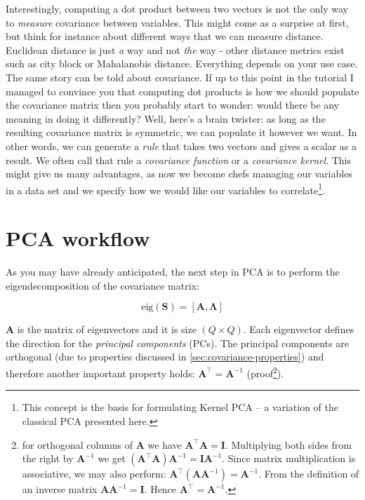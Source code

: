 \documentclass[10pt,twocolumn]{article}
\begin{document}
Interestingly, computing a dot product between two vectors is not the only way to \textit{measure} covariance between variables. This might come as a surprise at first, but think for instance about different ways that we can measure distance. Euclidean distance is just \textit{a} way and not \textit{the} way - other distance metrics exist such as city block or Mahalanobis distance. Everything depends on your use case. The same story can be told about covariance. If up to this point in the tutorial I managed to convince you that computing dot products is how we should populate the covariance matrix then you probably start to wonder: would there be any meaning in doing it differently? Well, here's a brain twister: as long as the resulting covariance matrix is symmetric, we can populate it however we want. In other words, we can generate a \textit{rule} that takes two vectors and gives a scalar as a result. We often call that rule a \textit{covariance function} or a \textit{covariance kernel}. This might give us many advantages, as now we become chefs managing our variables in a data set and we specify how we would like our variables to correlate\footnote{This concept is the basis for formulating Kernel PCA -- a variation of the classical PCA presented here.}.


\section{PCA workflow}

As you may have already anticipated, the next step in PCA is to perform the eigendecomposition of the covariance matrix:

\begin{equation} \label{eq:eig-dec}
\text{eig}(\mathbf{S}) = [\mathbf{A}, \mathbf{\Lambda}]
\end{equation}

$\mathbf{A}$ is the matrix of eigenvectors and it is size $(Q \times Q)$. Each eigenvector defines the direction for the \textit{principal components} (PCs). The principal components are orthogonal (due to properties discussed in \ref{sec:covariance-properties}) and therefore another important property holds: $\mathbf{A}^{\top} = \mathbf{A}^{-1}$ (proof\footnote{for orthogonal columns of $\mathbf{A}$ we have $\mathbf{A}^{\top} \mathbf{A} = \mathbf{I}$. Multiplying both sides from the right by $ \mathbf{A}^{-1}$ we get $(\mathbf{A}^{\top} \mathbf{A}) \mathbf{A}^{-1}= \mathbf{I}\mathbf{A}^{-1}$. Since matrix multiplication is associative, we may also perform: $\mathbf{A}^{\top} (\mathbf{A} \mathbf{A}^{-1}) = \mathbf{A}^{-1}$. From the definition of an inverse matrix $\mathbf{A} \mathbf{A}^{-1} = \mathbf{I}$. Hence $\mathbf{A}^{\top} = \mathbf{A}^{-1}$.}).
\end{document}
